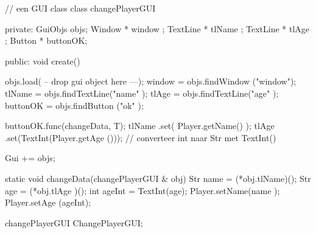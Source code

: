 \begin{code}
// een GUI class
class changePlayerGUI {
private:
   GuiObjs objs;
	 Window   * window  ;
	 TextLine * tlName  ;
	 TextLine * tlAge   ;
	 Button   * buttonOK;
	
public:
   void create() {
	    objs.load( -- drop gui object here ---);
			window   = objs.findWindow  ("window");
			tlName   = objs.findTextLine("name"  );
			tlAge    = objs.findTextLine("age"   );
			buttonOK = objs.findButton  ("ok"    );
			
			buttonOK.func(changeData, T);
			tlName  .set(        Player.getName() );
			tlAge   .set(TextInt(Player.getAge ())); // converteer int naar Str met TextInt()
			
			Gui += objs;
   }
	
	 static void changeData(changePlayerGUI & obj) {
	    Str name = (*obj.tlName)();
	 	  Str age  = (*obj.tlAge )();
	 	  int ageInt = TextInt(age);
	 	  Player.setName(name  );
	 	  Player.setAge (ageInt);
   }
}

changePlayerGUI ChangePlayerGUI;
\end{code}
